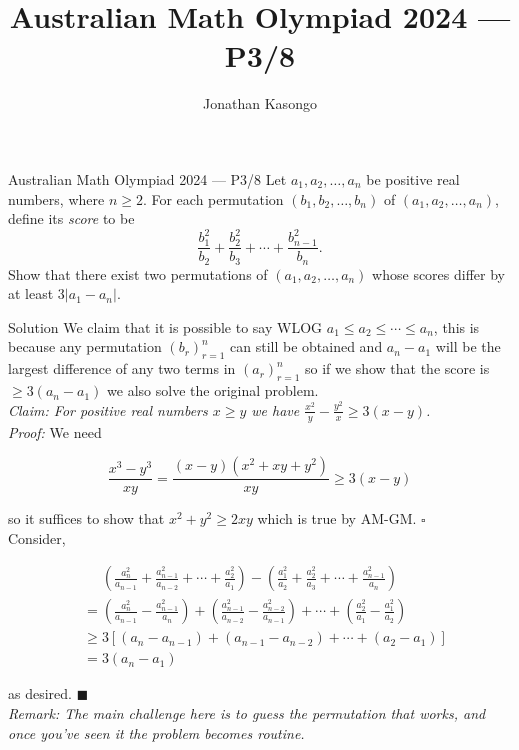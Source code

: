 \documentclass{article}
\author{Jonathan Kasongo}
\title{Australian Math Olympiad 2024 --- P3/8}
\begin{document}
\maketitle

\begin{problem}{Australian Math Olympiad 2024 --- P3/8}
Let \( a_1, a_2, \ldots, a_n \) be positive real numbers, where \( n \geq 2 \). For each permutation
\( (b_1, b_2, \ldots, b_n) \) of \( (a_1, a_2, \ldots, a_n) \), define its \textit{score} to be
\[
\frac{b_1^2}{b_2} + \frac{b_2^2}{b_3} + \cdots + \frac{b_{n-1}^2}{b_n}.
\]
Show that there exist two permutations of \( (a_1, a_2, \ldots, a_n) \) whose scores differ by at least \( 3 |a_1 - a_n| \).
\end{problem}

\begin{solution}{Solution}
We claim that it is possible to say WLOG
$a_1 \leq a_2 \leq \cdots \leq a_n$, this is because any permutation
$(b_r)_{r=1}^n$ can still be obtained and $a_n - a_1$ will be the largest
difference of any two terms in $(a_r)_{r=1}^n$ so if we show that the score
is $\geq 3(a_n - a_1)$ we also solve the original problem. \\

\textit{Claim: For positive real numbers $x \geq y$ we have $\frac{x^2}{y}
- \frac{y^2}{x} \geq 3(x-y)$.}\\

\textit{Proof:} We need

$$
\frac{x^3 - y^3}{xy} = \frac{(x-y)(x^2 + xy + y^2)}{xy} \geq 3(x-y)
$$

so it suffices to show that $x^2 + y^2 \geq 2xy$ which is true by AM-GM.
$\square$\\

Consider,

\[
\begin{aligned}
&\phantom{=} \left( \frac{a_n^2}{a_{n-1}} + \frac{a_{n-1}^2}{a_{n-2}} + \cdots +
\frac{a_2^2}{a_1} \right) -
\left( \frac{a_1^2}{a_2} + \frac{a_2^2}{a_3} + \cdots +
\frac{a_{n-1}^2}{a_n} \right)\\
&= \left( \frac{a_n^2}{a_{n-1}} - \frac{a_{n-1}^2}{a_n} \right) +
\left( \frac{a_{n-1}^2}{a_{n-2}} - \frac{a_{n-2}^2}{a_{n-1}} \right) +
\cdots + \left( \frac{a_2^2}{a_1} - \frac{a_1^2}{a_2} \right) \\
&\geq 3\left[ (a_n - a_{n-1}) + (a_{n-1} - a_{n-2}) + \cdots + (a_2 - a_1)
\right]\\
&= 3(a_n - a_1)
\end{aligned}
\]

as desired. $\blacksquare$\\

\textit{Remark: The main challenge here is to guess the permutation that
works, and once you've seen it the problem becomes routine.}
\end{solution}
\end{document}
